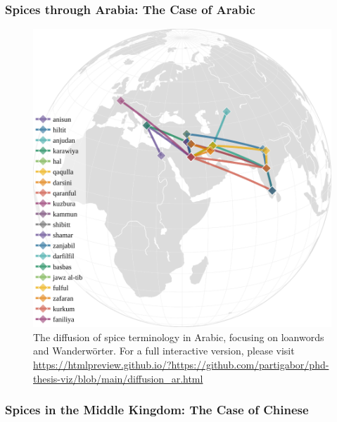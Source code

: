 \blindtext

\subsubsection{Spices through Arabia: The Case of Arabic}

\begin{figure}[ht!]
    \includegraphics[width=\linewidth]{imgs/plots/diffusion_ar.pdf}
    \caption{The diffusion of spice terminology in Arabic, focusing on loanwords and Wanderwörter. For a full interactive version, please visit \url{https://htmlpreview.github.io/?https://github.com/partigabor/phd-thesis-viz/blob/main/diffusion_ar.html}}
    \label{fig:diffusion_ar}
\end{figure}

\blindtext

\subsubsection{Spices in the Middle Kingdom: The Case of Chinese }

